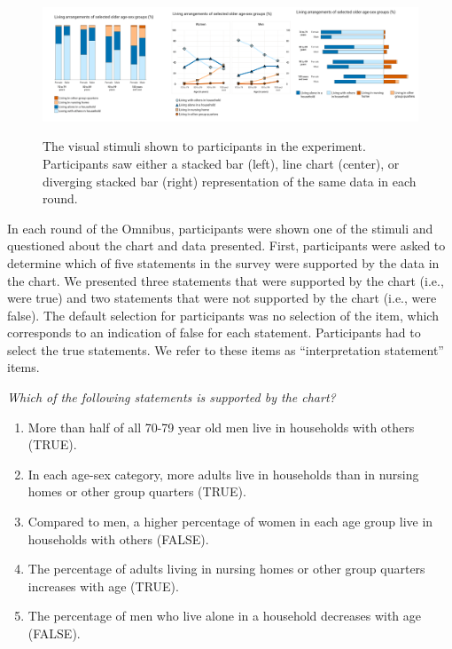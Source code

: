 \documentclass{IEEEcsmag}
\begin{document}
\begin{figure}
\includegraphics[width=36pc]{images/visual-stimuli-combined.png}
\label{stimulus-images}
\caption{The visual stimuli shown to participants in the experiment. Participants saw either a stacked bar (left), line chart (center), or diverging stacked bar (right) representation of the same data in each round.}
\end{figure}

In each round of the Omnibus, participants were shown one of the stimuli and questioned about the chart and data presented. First, participants were asked to determine which of five statements in the survey were supported by the data in the chart. We presented three statements that were supported by the chart (i.e., were true) and two statements that were not supported by the chart (i.e., were false). The default selection for participants was no selection of the item, which corresponds to an indication of false for each statement. Participants had to select the true statements. We refer to these items as ``interpretation statement'' items.

\emph{Which of the following statements is supported by the chart?}

\begin{enumerate}
\item{More than half of all 70-79 year old men live in households with others (TRUE).}
\item{In each age-sex category, more adults live in households than in nursing homes or other group quarters (TRUE).}
\item{Compared to men, a higher percentage of women in each age group live in households with others (FALSE).}
\item{The percentage of adults living in nursing homes or other group quarters increases with age (TRUE).}
\item{The percentage of men who live alone in a household decreases with age (FALSE).}
\end{enumerate}
\end{document}
